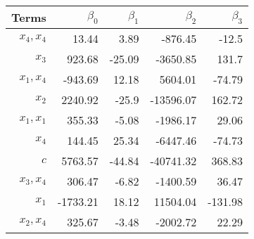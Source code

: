 \begin{tabular}{rrrrr}
Terms & $\beta_0$ & $\beta_1$ & $\beta_2$ & $\beta_3$ \\ 
\hline 
$x_4,x_4$ & 13.44 & 3.89 & -876.45 & -12.5 \\ 
$x_3$ & 923.68 & -25.09 & -3650.85 & 131.7 \\ 
$x_1,x_4$ & -943.69 & 12.18 & 5604.01 & -74.79 \\ 
$x_2$ & 2240.92 & -25.9 & -13596.07 & 162.72 \\ 
$x_1,x_1$ & 355.33 & -5.08 & -1986.17 & 29.06 \\ 
$x_4$ & 144.45 & 25.34 & -6447.46 & -74.73 \\ 
$c$ & 5763.57 & -44.84 & -40741.32 & 368.83 \\ 
$x_3,x_4$ & 306.47 & -6.82 & -1400.59 & 36.47 \\ 
$x_1$ & -1733.21 & 18.12 & 11504.04 & -131.98 \\ 
$x_2,x_4$ & 325.67 & -3.48 & -2002.72 & 22.29 \\ 
\hline 
\end{tabular}